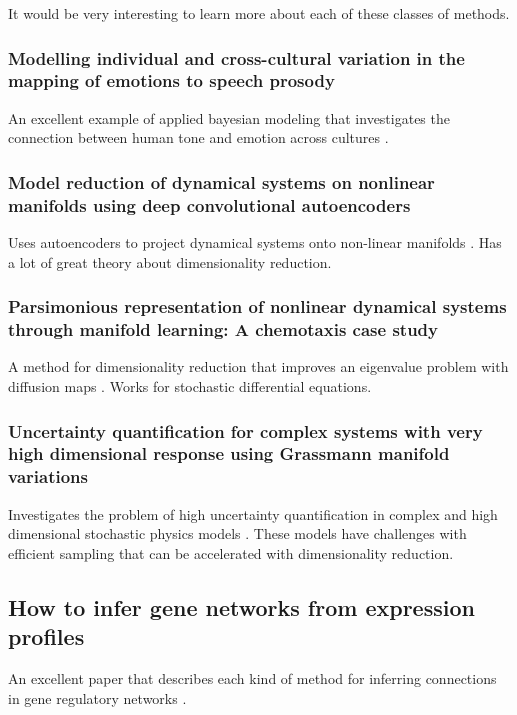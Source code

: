 \documentclass{article}
\begin{document}
        It would be very interesting to learn more about each of these classes of methods.

    \subsubsection*{Modelling individual and cross-cultural variation in the mapping of emotions to speech prosody}
        An excellent example of applied bayesian modeling that investigates the connection between human
        tone and emotion across cultures \cite{vanrijn2023modeling}.

    \subsubsection*{Model reduction of dynamical systems on nonlinear manifolds using deep convolutional autoencoders}
        Uses autoencoders to project dynamical systems onto non-linear manifolds \cite{lee2020model}.
        Has a lot of great theory about dimensionality reduction.

    \subsubsection*{Parsimonious representation of nonlinear dynamical systems through manifold learning: A chemotaxis case study}
        A method for dimensionality reduction that improves an eigenvalue problem with diffusion maps \cite{dsilva2018parsimonious}. Works for
        stochastic differential equations.

    \subsubsection*{Uncertainty quantification for complex systems with very high dimensional response using Grassmann manifold variations}
        Investigates the problem of high uncertainty quantification in complex and high dimensional stochastic physics
        models \cite{giovanis2018uncertainty}. These models have challenges with efficient sampling that can be accelerated with
        dimensionality reduction.

    \subsection*{How to infer gene networks from expression profiles}
        An excellent paper that describes each kind of method for inferring
        connections in gene regulatory networks \cite{bansal2007infer}.
\end{document}
